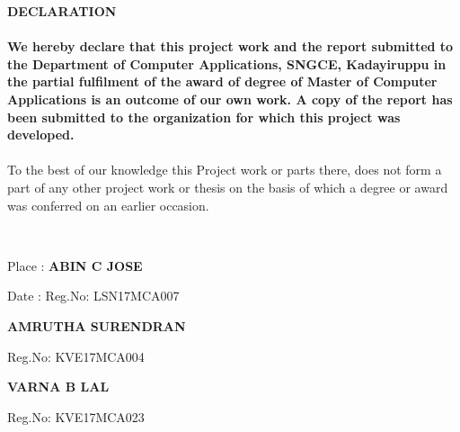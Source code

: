 \documentclass[a4paper, 12pt]{report}
\begin{document}
\begin{titlepage}
	{\fontsize{16pt}{16pt}\selectfont\bfseries\center DECLARATION \par}
	\paragraph{}{\fontsize{12pt}{12pt}\selectfont\bfseries We hereby declare that this project work and the report submitted to the Department of
Computer Applications, SNGCE, Kadayiruppu in the partial fulfilment of the award of degree
of Master of Computer Applications is an outcome of our own work.
A copy of the report has been submitted to the organization for which this project was
developed.
\paragraph{}To the best of our knowledge this Project work or parts there, does not form a part of
any other project work or thesis on the basis of which a degree or award was conferred on an
earlier occasion.}\\\vspace{3cm}
	
	{\fontsize{14pt}{14pt}\selectfont Place : \hspace{211pt} \fontsize{14pt}{14pt}\selectfont\bfseries ABIN C JOSE\par}
    {\fontsize{14pt}{14pt}\selectfont Date : \hspace{215pt}   Reg.No: LSN17MCA007 \par}	
    {\fontsize{14pt}{14pt}\selectfont  \hspace{260pt} \fontsize{14pt}{14pt}\selectfont\bfseries AMRUTHA SURENDRAN\par}
    {\fontsize{14pt}{14pt}\selectfont  \hspace{260pt}   Reg.No: KVE17MCA004 \par}
    
{\fontsize{14pt}{14pt}\selectfont  \hspace{260pt} \fontsize{14pt}{14pt}\selectfont\bfseries VARNA B LAL\par}
    {\fontsize{14pt}{14pt}\selectfont  \hspace{260pt}   Reg.No: KVE17MCA023 \par}
\end{titlepage}

\end{document}
